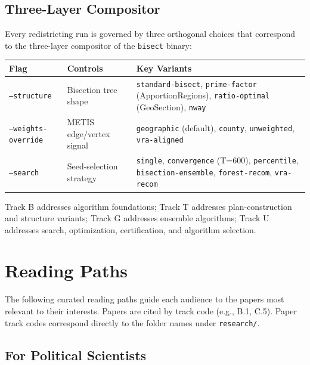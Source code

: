 \documentclass[12pt]{article}
\begin{document}
\subsection*{Three-Layer Compositor}

Every redistricting run is governed by three orthogonal choices that
correspond to the three-layer compositor of the \texttt{bisect} binary:

\begin{center}
\begin{tabular}{@{}lll@{}}
\toprule
\textbf{Flag} & \textbf{Controls} & \textbf{Key Variants} \\
\midrule
\texttt{--structure} & Bisection tree shape &
    \texttt{standard-bisect}, \texttt{prime-factor} (ApportionRegions),
    \texttt{ratio-optimal} (GeoSection), \texttt{nway} \\[4pt]
\texttt{--weights-override} & METIS edge/vertex signal &
    \texttt{geographic} (default), \texttt{county}, \texttt{unweighted},
    \texttt{vra-aligned} \\[4pt]
\texttt{--search} & Seed-selection strategy &
    \texttt{single}, \texttt{convergence} (T=600), \texttt{percentile},
    \texttt{bisection-ensemble}, \texttt{forest-recom}, \texttt{vra-recom} \\
\bottomrule
\end{tabular}
\end{center}

Track B addresses algorithm foundations; Track T addresses plan-construction
and structure variants; Track G addresses ensemble algorithms; Track U
addresses search, optimization, certification, and algorithm selection.


\section{Reading Paths}

The following curated reading paths guide each audience to the papers most
relevant to their interests. Papers are cited by track code (e.g., B.1, C.5).
Paper track codes correspond directly to the folder names under
\texttt{research/}.

\subsection{For Political Scientists}
\end{document}
